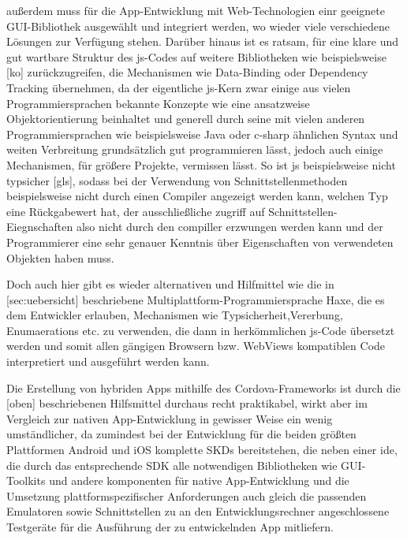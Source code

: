 außerdem muss für die App-Entwicklung mit Web-Technologien einr geeignete GUI-Bibliothek ausgewählt und integriert werden, wo wieder viele verschiedene Lösungen zur Verfügung stehen.
Darüber hinaus ist es ratsam, für eine klare und gut wartbare Struktur des \gls{js}-Codes auf weitere Bibliotheken wie beispielsweise [ko] zurückzugreifen, die Mechanismen wie Data-Binding oder Dependency Tracking übernehmen, da der eigentliche \gls{js}-Kern zwar einige aus vielen Programmiersprachen bekannte Konzepte wie eine ansatzweise Objektorientierung beinhaltet und generell durch seine mit vielen anderen Programmiersprachen wie beispielsweise Java oder \gls{c-sharp} ähnlichen Syntax und weiten Verbreitung grundsätzlich gut programmieren lässt, jedoch auch einige Mechanismen, \zB für größere Projekte, vermissen lässt.
So ist \gls{js} beispielsweise nicht typsicher [gls], sodass bei der Verwendung von Schnittstellenmethoden beispielsweise nicht durch einen Compiler angezeigt werden kann, welchen Typ eine Rückgabewert hat, der ausschließliche zugriff auf Schnittstellen-Eiegnschaften also nicht durch den compiller erzwungen werden kann und der Programmierer eine sehr genauer Kenntnis über Eigenschaften von verwendeten Objekten haben muss.

Doch auch hier gibt es wieder alternativen und Hilfmittel wie \zB die in [sec:uebersicht] beschriebene Multiplattform-Programmiersprache Haxe, die es dem Entwickler erlauben, Mechanismen wie Typsicherheit,Vererbung, Enumaerations etc. zu verwenden, die dann in herkömmlichen \gls{js}-Code übersetzt werden und somit allen gängigen Browsern bzw. WebViews kompatiblen Code interpretiert und ausgeführt werden kann.

Die Erstellung von hybriden Apps mithilfe des Cordova-Frameworks ist durch die [oben] beschriebenen Hilfsmittel durchaus recht praktikabel, wirkt aber im Vergleich zur nativen App-Entwicklung in gewisser Weise ein wenig umständlicher, da zumindest bei der Entwicklung für die beiden größten Plattformen Android und iOS komplette SKDs bereitstehen, die neben einer ide, die durch das entsprechende SDK alle notwendigen Bibliotheken wie GUI-Toolkits und andere komponenten für native App-Entwicklung und die Umsetzung plattformspezifischer Anforderungen auch gleich die passenden Emulatoren sowie Schnittstellen zu an den Entwicklungsrechner angeschlossene Testgeräte für die Ausführung der zu entwickelnden App mitliefern.

